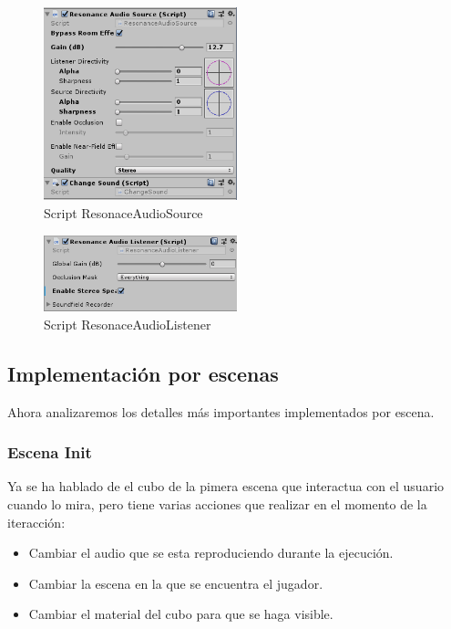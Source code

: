 \begin{figure}[htb]
	\centering
	\includegraphics[width=0.5\textwidth]{./imagenes/audiosource}
	\caption{Script ResonaceAudioSource}
\end{figure} 

\begin{figure}[htb]
	\centering
	\includegraphics[width=0.5\textwidth]{./imagenes/audiolistener}
	\caption{Script ResonaceAudioListener}
\end{figure} 

\subsection{Implementación por escenas}

\quad Ahora analizaremos los detalles más importantes implementados por escena.\\
 
	\subsubsection{Escena Init}

\quad Ya se ha hablado de el cubo de la pimera escena que interactua con el usuario cuando lo mira, pero tiene varias acciones que realizar en el momento de la iteracción:\\

\begin{itemize}
	\item Cambiar el audio que se esta reproduciendo durante la ejecución.
	\item Cambiar la escena en la que se encuentra el jugador.
	\item Cambiar el material del cubo para que se haga visible.
\end{itemize}

